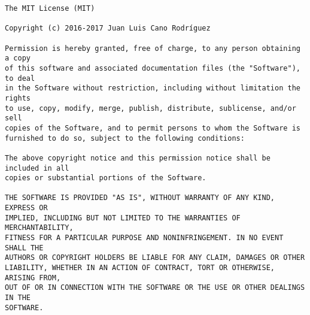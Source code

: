 \begin{scriptsize}
\begin{verbatim}
The MIT License (MIT)

Copyright (c) 2016-2017 Juan Luis Cano Rodríguez

Permission is hereby granted, free of charge, to any person obtaining a copy
of this software and associated documentation files (the "Software"), to deal
in the Software without restriction, including without limitation the rights
to use, copy, modify, merge, publish, distribute, sublicense, and/or sell
copies of the Software, and to permit persons to whom the Software is
furnished to do so, subject to the following conditions:

The above copyright notice and this permission notice shall be included in all
copies or substantial portions of the Software.

THE SOFTWARE IS PROVIDED "AS IS", WITHOUT WARRANTY OF ANY KIND, EXPRESS OR
IMPLIED, INCLUDING BUT NOT LIMITED TO THE WARRANTIES OF MERCHANTABILITY,
FITNESS FOR A PARTICULAR PURPOSE AND NONINFRINGEMENT. IN NO EVENT SHALL THE
AUTHORS OR COPYRIGHT HOLDERS BE LIABLE FOR ANY CLAIM, DAMAGES OR OTHER
LIABILITY, WHETHER IN AN ACTION OF CONTRACT, TORT OR OTHERWISE, ARISING FROM,
OUT OF OR IN CONNECTION WITH THE SOFTWARE OR THE USE OR OTHER DEALINGS IN THE
SOFTWARE.
\end{verbatim}
\end{scriptsize}
